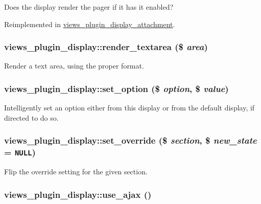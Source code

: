 Does the display render the pager if it has it enabled? 

Reimplemented in \hyperlink{classviews__plugin__display__attachment_ecc79a155c6491a0c510568b07c97fb8}{views\_\-plugin\_\-display\_\-attachment}.\hypertarget{classviews__plugin__display_7f1219c7f3910d1310e5f1beae1a1aa6}{
\subsubsection[{render\_\-textarea}]{\setlength{\rightskip}{0pt plus 5cm}views\_\-plugin\_\-display::render\_\-textarea (\$ {\em area})}}
\label{classviews__plugin__display_7f1219c7f3910d1310e5f1beae1a1aa6}


Render a text area, using the proper format. \hypertarget{classviews__plugin__display_5a0689b3004e556b51b054062a8467c6}{
\subsubsection[{set\_\-option}]{\setlength{\rightskip}{0pt plus 5cm}views\_\-plugin\_\-display::set\_\-option (\$ {\em option}, \/  \$ {\em value})}}
\label{classviews__plugin__display_5a0689b3004e556b51b054062a8467c6}


Intelligently set an option either from this display or from the default display, if directed to do so. \hypertarget{classviews__plugin__display_06eae6326562b974ee8c3c8106a1c130}{
\subsubsection[{set\_\-override}]{\setlength{\rightskip}{0pt plus 5cm}views\_\-plugin\_\-display::set\_\-override (\$ {\em section}, \/  \$ {\em new\_\-state} = {\tt NULL})}}
\label{classviews__plugin__display_06eae6326562b974ee8c3c8106a1c130}


Flip the override setting for the given section. \hypertarget{classviews__plugin__display_7983d89c2a4aabab1df7ceb31d700a3c}{
\subsubsection[{use\_\-ajax}]{\setlength{\rightskip}{0pt plus 5cm}views\_\-plugin\_\-display::use\_\-ajax ()}}
\label{classviews__plugin__display_7983d89c2a4aabab1df7ceb31d700a3c}


